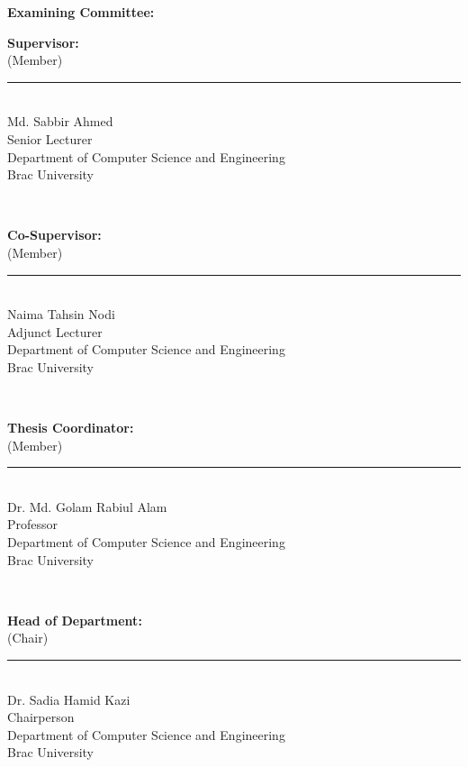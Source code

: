 \documentclass[12pt,a4paper]{report}
\begin{document}
\vspace{1em}\noindent\textbf{Examining Committee:}\par\vspace{0.5em}
\noindent\begin{minipage}[t]{0.3\textwidth}\textbf{Supervisor:}\\ (Member)\end{minipage}\begin{minipage}[t]{0.65\textwidth}\vspace{1.5em}\rule{0.7\textwidth}{0.4pt}\\ Md. Sabbir Ahmed\\ Senior Lecturer\\ Department of Computer Science and Engineering\\ Brac University\end{minipage}\\[1.5em]
\noindent\begin{minipage}[t]{0.3\textwidth}\textbf{Co-Supervisor:}\\ (Member)\end{minipage}\begin{minipage}[t]{0.65\textwidth}\vspace{1.5em}\rule{0.7\textwidth}{0.4pt}\\ Naima Tahsin Nodi\\ Adjunct Lecturer\\ Department of Computer Science and Engineering\\ Brac University\end{minipage}\\[1.5em]
\noindent\begin{minipage}[t]{0.3\textwidth}\textbf{Thesis Coordinator:}\\ (Member)\end{minipage}\begin{minipage}[t]{0.65\textwidth}\vspace{1.5em}\rule{0.7\textwidth}{0.4pt}\\ Dr. Md. Golam Rabiul Alam\\ Professor\\ Department of Computer Science and Engineering\\ Brac University\end{minipage}\\[1.5em]
\noindent\begin{minipage}[t]{0.3\textwidth}\textbf{Head of Department:}\\ (Chair)\end{minipage}\begin{minipage}[t]{0.65\textwidth}\vspace{1.5em}\rule{0.7\textwidth}{0.4pt}\\ Dr. Sadia Hamid Kazi\\ Chairperson\\ Department of Computer Science and Engineering\\ Brac University\end{minipage}\\[1.5em]
\end{document}
